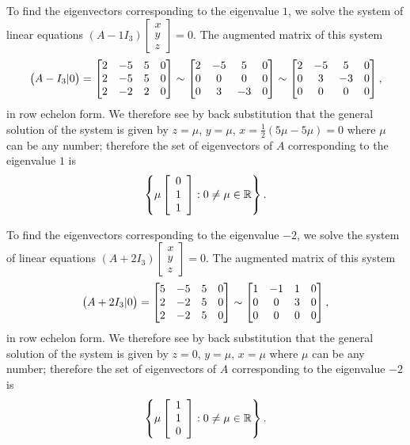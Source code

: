 \documentclass[a4paper]{amsart}
\renewenvironment{solution}{\SolutionInline}{\endSolutionInline}
\begin{document}
\begin{solution}
 To find the eigenvectors corresponding to the eigenvalue $1$, we
 solve the system of linear equations $(A - 1I_3)\left[
 \begin{array}{c}x \\ y\\z
 \end{array} \right] = 0$. The augmented matrix of this system
 $$
 \big(A - I_3|0\big) = \left[\begin{matrix} 2 & -5 & 5 &0\\
     2 & -5 & 5 &0\\
     2 & -2 & 2&0\end{matrix}\right] \sim
 \left[\begin{matrix} 2 & -5 & 5 &0\\
     0 & 0 & 0 &0\\
     0 & 3 & -3&0\end{matrix}\right] \sim
 \left[\begin{matrix} 2 & -5 & 5 &0\\
     0 & 3 & -3 &0\\
     0 & 0 & 0&0\end{matrix}\right],
 $$
 in row echelon form. We therefore see by back substitution that
 the general solution of the system is given by $z = \mu$, $y =
 \mu$, $x = \frac{1}{2}(5\mu - 5\mu) = 0$ where $\mu$ can be any
 number; therefore the set of eigenvectors of $A$ corresponding to
 the eigenvalue $1$ is
 $$
 \left\{ \mu \left[ \begin{array}{c} 0\\1\\1
 \end{array} \right] : 0 \neq \mu \in {\mathbb{R}} \right\}.
 $$

 To find the eigenvectors corresponding to the eigenvalue $-2$, we
 solve the system of linear equations $(A + 2I_3)\left[
 \begin{array}{c}x \\ y\\z
 \end{array} \right] = 0$. The augmented matrix of this system
 $$
 \big(A +2 I_3|0\big) = \left[\begin{matrix} 5 & -5 & 5 &0\\
     2 & -2 & 5 &0\\
     2 & -2 & 5&0\end{matrix}\right] \sim
 \left[\begin{matrix} 1 & -1 & 1 &0\\
     0 & 0 & 3 &0\\
     0 & 0 & 0&0\end{matrix}\right],
 $$
 in row echelon form. We therefore see by back substitution that
 the general solution of the system is given by $z = 0$, $y = \mu$,
 $x = \mu$ where $\mu$ can be any number; therefore the set of
 eigenvectors of $A$ corresponding to the eigenvalue $-2$ is
 $$
 \left\{ \mu \left[ \begin{array}{c} 1\\1\\0
 \end{array} \right] : 0 \neq \mu \in {\mathbb{R}} \right\}.
 $$


\end{solution}
\end{document}

